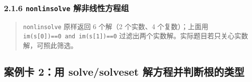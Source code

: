 \subsubsection{\texorpdfstring{2.1.6 \texttt{nonlinsolve}
解非线性方程组}{2.1.6 nonlinsolve 解非线性方程组}}\label{nonlinsolve-ux89e3ux975eux7ebfux6027ux65b9ux7a0bux7ec4}

\begin{Shaded}
\begin{Highlighting}[]
\OperatorTok{=}\NormalTok{)}
\OperatorTok{=}\NormalTok{ [x}\OperatorTok{**} \OperatorTok{+}\OperatorTok{**} \OperatorTok{{-}} \OperatorTok{**} \OperatorTok{+}\OperatorTok{**}\NormalTok{]}
\OperatorTok{=}
\OperatorTok{=} \NormalTok{([s }\NormalTok{ sp.im(s[}\NormalTok{]) }\OperatorTok{==}  \NormalTok{ sp.im(s[}\NormalTok{]) }\OperatorTok{==} \NormalTok{], key}\OperatorTok{=}\NormalTok{)}
\NormalTok{(}
\NormalTok{(}\NormalTok{, }
\end{Highlighting}
\end{Shaded}

\begin{Shaded}
\begin{Highlighting}[]
\end{Highlighting}
\end{Shaded}

\begin{quote}
\texttt{nonlinsolve} 原样返回 6 个解（2 个实数、4 个复数）；上面用
\texttt{im(s{[}0{]})==0\ and\ im(s{[}1{]})==0}
过滤出两个实数解。实际题目若只关心实数解，可照此筛选。
\end{quote}

\subsection{案例卡 2：用 solve/solveset
解方程并判断根的类型}\label{ux6848ux4f8bux5361-2ux7528-solvesolveset-ux89e3ux65b9ux7a0bux5e76ux5224ux65adux6839ux7684ux7c7bux578b}


